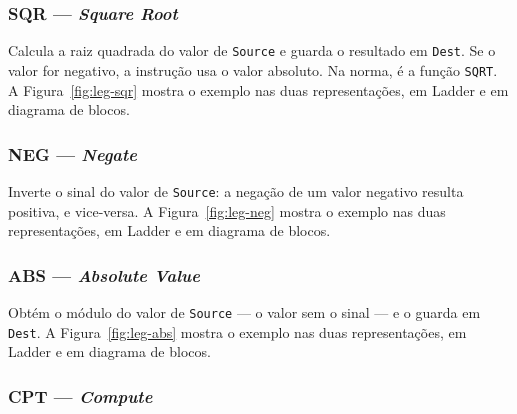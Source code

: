 
\subsubsection{SQR --- \emph{Square Root}}

Calcula a raiz quadrada do valor de \texttt{Source} e guarda o resultado em \texttt{Dest}. Se o valor
for negativo, a instrução usa o valor absoluto. Na norma, é a função \texttt{SQRT}.
A Figura~\ref{fig:leg-sqr} mostra o exemplo nas duas representações, em Ladder e em diagrama de blocos.


\subsubsection{NEG --- \emph{Negate}}

Inverte o sinal do valor de \texttt{Source}: a negação de um valor negativo resulta positiva, e
vice-versa.
A Figura~\ref{fig:leg-neg} mostra o exemplo nas duas representações, em Ladder e em diagrama de blocos.


\subsubsection{ABS --- \emph{Absolute Value}}

Obtém o módulo do valor de \texttt{Source} --- o valor sem o sinal --- e o guarda em \texttt{Dest}.
A Figura~\ref{fig:leg-abs} mostra o exemplo nas duas representações, em Ladder e em diagrama de blocos.


\subsubsection{CPT --- \emph{Compute}}

